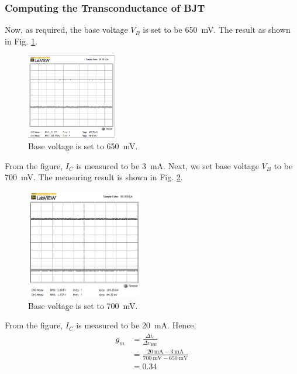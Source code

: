 \documentclass[journal]{IEEEtran}
\begin{document}
\subsubsection{Computing the Transconductance of BJT}
\par Now, as required, the base voltage $V_{B}$ is set to be \SI{650}{\mV}. The result as
shown in Fig. \ref{fig-3-4}.
\begin{figure}[h]
  \centering
  \includegraphics[width=0.35\textwidth]{images/650mV.png}
  \caption{Base voltage is set to \SI{650}{\mV}.}
  \label{fig-3-4}
\end{figure}
\clearpage
\par From the figure, $I_{C}$ is measured to be  \SI{3}{\mA}. Next, we set base voltage $V_{B}$
to be \SI{700}{\mV}. The measuring result is shown in Fig. \ref{fig-3-5}.
\begin{figure}[h]
  \centering
  \includegraphics[width=0.45\textwidth]{images/700mV.png}
  \caption{Base voltage is set to \SI{700}{\mV}.}
  \label{fig-3-5}
\end{figure}
\par From the figure, $I_{C}$ is measured to be \SI{20}{\mA}. Hence,
\begin{equation*}
  \begin{split}
  g_{m}&=\frac{\Delta i_{c}}{\Delta v_{BE}}\\
  &=\frac{\SI{20}{\mA}-\SI{3}{\mA}}{\SI{700}{\mV}-\SI{650}{\mV}}\\
  &=0.34
\end{split}
\end{equation*}
\end{document}
